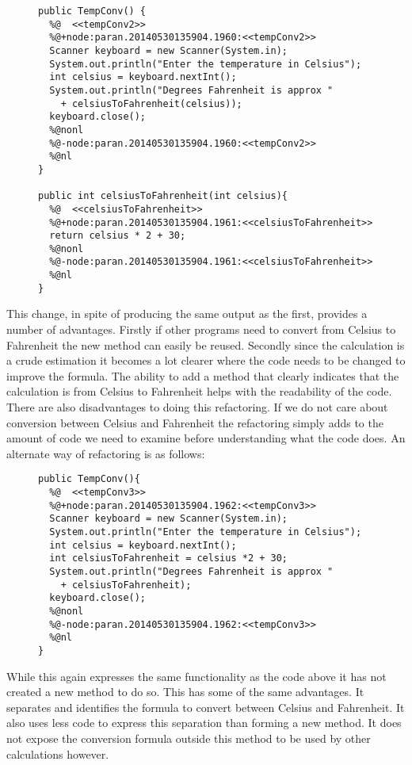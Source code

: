 \begin{figure}[!t]
\begin{lstlisting}
public TempConv() {
  %@  <<tempConv2>>
  %@+node:paran.20140530135904.1960:<<tempConv2>>
  Scanner keyboard = new Scanner(System.in);
  System.out.println("Enter the temperature in Celsius");
  int celsius = keyboard.nextInt();
  System.out.println("Degrees Fahrenheit is approx " 
    + celsiusToFahrenheit(celsius));
  keyboard.close();
  %@nonl
  %@-node:paran.20140530135904.1960:<<tempConv2>>
  %@nl
}

public int celsiusToFahrenheit(int celsius){
  %@  <<celsiusToFahrenheit>>
  %@+node:paran.20140530135904.1961:<<celsiusToFahrenheit>>
  return celsius * 2 + 30;
  %@nonl
  %@-node:paran.20140530135904.1961:<<celsiusToFahrenheit>>
  %@nl
}
\end{lstlisting}
\end{figure}

This change, in spite of producing the same output as the first, provides a number of advantages. Firstly if other programs need to convert from Celsius to Fahrenheit the new method can easily be reused. Secondly since the calculation is a crude estimation it becomes a lot clearer where the code needs to be changed to improve the formula. The ability to add a method that clearly indicates that the calculation is from Celsius to Fahrenheit helps with the readability of the code. There are also disadvantages to doing this refactoring. If we do not care about conversion between Celsius and Fahrenheit the refactoring simply adds to the amount of code we need to examine before understanding what the code does. An alternate way of refactoring is as follows:

\begin{figure}[!t]
\begin{lstlisting}
public TempConv(){
  %@  <<tempConv3>>
  %@+node:paran.20140530135904.1962:<<tempConv3>>
  Scanner keyboard = new Scanner(System.in);
  System.out.println("Enter the temperature in Celsius");
  int celsius = keyboard.nextInt();
  int celsiusToFahrenheit = celsius *2 + 30;
  System.out.println("Degrees Fahrenheit is approx " 
    + celsiusToFahrenheit);
  keyboard.close();
  %@nonl
  %@-node:paran.20140530135904.1962:<<tempConv3>>
  %@nl
}
\end{lstlisting}
\end{figure}

While this again expresses the same functionality as the code above it has not created a new method to do so. This has some of the same advantages. It separates and identifies the formula to convert between Celsius and Fahrenheit. It also uses less code to express this separation than forming a new method. It does not expose the conversion formula outside this method to be used by other calculations however.

